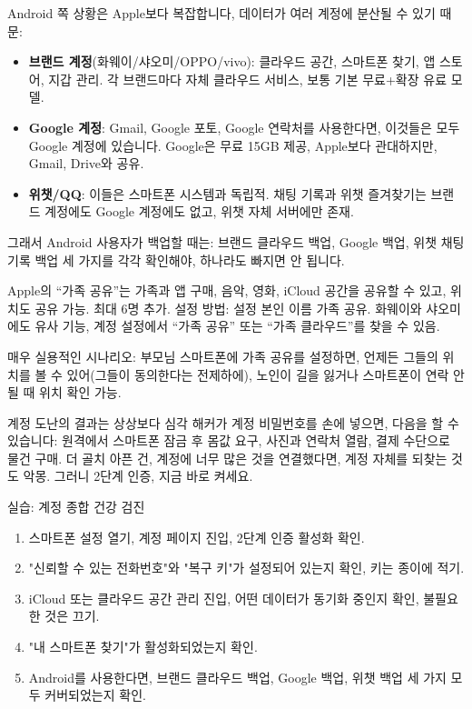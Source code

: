 Android 쪽 상황은 Apple보다 복잡합니다, 데이터가 여러 계정에 분산될 수 있기 때문:

\begin{itemize}
  \item \textbf{브랜드 계정}(화웨이/샤오미/OPPO/vivo): 클라우드 공간, 스마트폰 찾기, 앱 스토어, 지갑 관리. 각 브랜드마다 자체 클라우드 서비스, 보통 기본 무료+확장 유료 모델.
  \item \textbf{Google 계정}: Gmail, Google 포토, Google 연락처를 사용한다면, 이것들은 모두 Google 계정에 있습니다. Google은 무료 15GB 제공, Apple보다 관대하지만, Gmail, Drive와 공유.
  \item \textbf{위챗/QQ}: 이들은 스마트폰 시스템과 독립적. 채팅 기록과 위챗 즐겨찾기는 브랜드 계정에도 Google 계정에도 없고, 위챗 자체 서버에만 존재.
\end{itemize}

그래서 Android 사용자가 백업할 때는: 브랜드 클라우드 백업, Google 백업, 위챗 채팅 기록 백업 세 가지를 각각 확인해야, 하나라도 빠지면 안 됩니다.


Apple의 “가족 공유”는 가족과 앱 구매, 음악, 영화, iCloud 공간을 공유할 수 있고, 위치도 공유 가능. 최대 6명 추가. 설정 방법: 설정 본인 이름 가족 공유. 화웨이와 샤오미에도 유사 기능, 계정 설정에서 “가족 공유” 또는 “가족 클라우드”를 찾을 수 있음.

매우 실용적인 시나리오: 부모님 스마트폰에 가족 공유를 설정하면, 언제든 그들의 위치를 볼 수 있어(그들이 동의한다는 전제하에), 노인이 길을 잃거나 스마트폰이 연락 안 될 때 위치 확인 가능.

\begin{tcbwarn}{계정 도난의 결과는 상상보다 심각}
해커가 계정 비밀번호를 손에 넣으면, 다음을 할 수 있습니다: 원격에서 스마트폰 잠금 후 몸값 요구, 사진과 연락처 열람, 결제 수단으로 물건 구매. 더 골치 아픈 건, 계정에 너무 많은 것을 연결했다면, 계정 자체를 되찾는 것도 악몽. 그러니 2단계 인증, 지금 바로 켜세요.

\end{tcbwarn}

\begin{tcbpractice}{실습: 계정 종합 건강 검진}
\begin{enumerate}
  \item 스마트폰 설정 열기, 계정 페이지 진입, 2단계 인증 활성화 확인.
  \item "신뢰할 수 있는 전화번호"와 "복구 키"가 설정되어 있는지 확인, 키는 종이에 적기.
  \item iCloud 또는 클라우드 공간 관리 진입, 어떤 데이터가 동기화 중인지 확인, 불필요한 것은 끄기.
  \item "내 스마트폰 찾기"가 활성화되었는지 확인.
  \item Android를 사용한다면, 브랜드 클라우드 백업, Google 백업, 위챗 백업 세 가지 모두 커버되었는지 확인.
\end{enumerate}

\end{tcbpractice}
